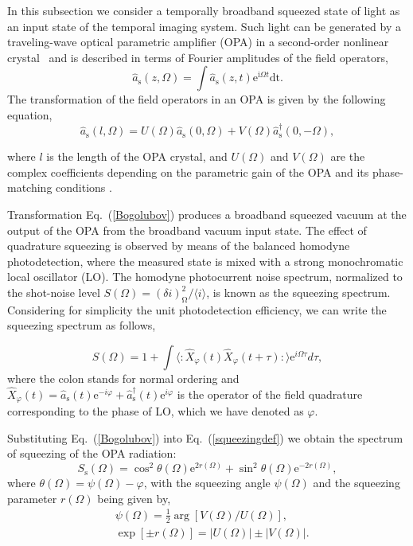 \documentclass[10pt,twocolumn]{article}
\begin{document}
{%
In this subsection we consider a temporally broadband squeezed state of light as an input state of the temporal imaging system. Such light can be generated by a traveling-wave optical parametric amplifier (OPA) in a second-order nonlinear crystal~\cite{Kolobov1999} and is described in terms of Fourier amplitudes of the field operators,
}
\begin{equation}
     \hat{a}_{\mathrm{s}}(z,\Omega)=\int \hat{a}_{\mathrm{s}}(z,t)\mathrm{e}^{\mathrm{i}\Omega t}\mathrm{dt}. \label{Fourier}
\end{equation}
%
{%
The transformation of the field operators in an OPA is given by the following equation,
}
%
\begin{equation}
     \hat{a}_{\mathrm{s}}(l,\Omega)=
     U(\Omega)\hat{a}_{\mathrm{s}}(0,\Omega)+V(\Omega)\hat{a}^{\dag}_{\mathrm{s}}(0,-\Omega), \label{Bogolubov}
\end{equation}
%
{%
where $l$ is the length of the OPA crystal, and $U(\Omega)$ and $V(\Omega)$ are the complex coefficients depending on the parametric gain of the OPA and its phase-matching conditions \cite{Kolobov1999}.

Transformation Eq.~(\ref{Bogolubov}) produces a broadband squeezed vacuum at the output of the OPA from the broadband vacuum input state. The effect of quadrature squeezing is observed by means of the balanced homodyne photodetection, where the measured state is mixed with a strong monochromatic local oscillator (LO). The homodyne photocurrent noise spectrum, normalized to the shot-noise level $S(\Omega)=(\delta i)^2_{\mathrm{\Omega}}/\langle i\rangle$, is known as the squeezing spectrum. Considering for simplicity the unit photodetection efficiency, we can write the squeezing spectrum as follows,
}
%
\begin{equation}
     S(\Omega)=1+\int\langle: \hat{X}_\varphi(t)\hat{X}_\varphi(t+\tau): \rangle \mathrm{e}^{i\Omega\tau}d\tau, \label{squeezingdef}
\end{equation}
%
where the colon stands for normal ordering and $\hat{X}_\varphi(t) = \hat{a}_{\mathrm{s}}(t)\mathrm{e}^{-i\varphi} +\hat{a}_{\mathrm{s}}^\dagger(t)\mathrm{e}^{i\varphi}$ is the operator of the field quadrature corresponding to the phase of LO, which we have denoted as $\varphi$.
%

Substituting Eq.~(\ref{Bogolubov}) into Eq.~(\ref{squeezingdef}) we obtain the spectrum of squeezing of the OPA radiation:
\begin{equation}
     S_{\mathrm{s}}(\Omega)=\cos^2\theta(\Omega)\mathrm{e}^{2r(\Omega)} +\sin^2\theta(\Omega)\mathrm{e}^{-2r(\Omega)}, \label{squeezing}
\end{equation}
%
where $\theta(\Omega)=\psi(\Omega)-\varphi$, with the squeezing angle $\psi(\Omega)$ and the squeezing parameter $r(\Omega)$ being given by,
%
\begin{eqnarray}
     &\psi(\Omega)=
     \frac{1}{2}\arg[V(\Omega)/U(\Omega)],\label{sq_angle}
     \\
     &\exp[\pm r(\Omega)]=|U(\Omega)|\pm|V(\Omega)|.\label{sq_param}
\end{eqnarray}
%
\end{document}
